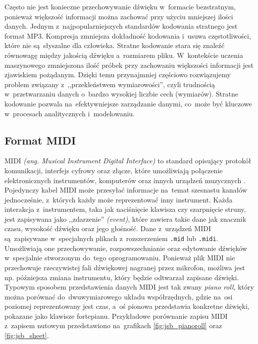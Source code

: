\documentclass[data-science]{agh-wi} %
\begin{document}
Często nie jest konieczne przechowywanie dźwięku w~formacie bezstratnym, ponieważ większość informacji można zachować przy użyciu mniejszej ilości danych. Jednym z~najpopularniejszych standardów kodowania stratnego jest format MP3. Kompresja zmniejsza dokładność kodowania i~usuwa częstotliwości, które nie są~słyszalne dla człowieka. Stratne kodowanie stara się znaleźć równowagę między jakością dźwięku a~rozmiarem pliku. W~kontekście uczenia maszynowego zmniejszona ilość próbek przy zachowaniu większości informacji jest zjawiskiem pożądanym. Dzięki temu przynajmniej częściowo rozwiązujemy problem związany z~,,przekleństwem wymiarowości'', czyli trudnością w~przetwarzaniu danych o~bardzo wysokiej liczbie cech (wymiarów). Stratne kodowanie pozwala na~efektywniejsze zarządzanie danymi, co~może być kluczowe w~procesach analitycznych i~modelowaniu.

\subsection{Format MIDI}
MIDI \textit{(ang. Musical Instrument Digital Interface)} to standard opisujący protokół komunikacji, interfejs cyfrowy oraz złącze, które umożliwiają połączenie elektronicznych instrumentów, komputerów oraz innych urządzeń muzycznych \cite{midi_specification}. Pojedynczy kabel MIDI może przesyłać informacje na~temat szesnastu kanałów jednocześnie, z~których każdy może reprezentować inny instrument. Każda interakcja z~instrumentem, taka jak naciśnięcie klawisza czy szarpnięcie struny, jest zapisywana jako ,,zdarzenie'' \textit{(event)}, które zawiera takie dane jak znacznik czasu, wysokość dźwięku oraz jego głośność. Dane z~urządzeń MIDI są~zapisywane w~specjalnych plikach z~rozszerzeniem \texttt{.mid} lub \texttt{.midi}. Umożliwiają one przechowywanie, rozpowszechnianie oraz edytowanie dźwięków w~specjalnie stworzonym do~tego oprogramowaniu. Ponieważ plik MIDI nie przechowuje rzeczywistej fali dźwiękowej nagranej przez mikrofon, możliwa jest np. późniejsza zmiana instrumentu, który będzie odtwarzał zapisane dźwięki. Typowym sposobem przedstawienia danych MIDI jest tak zwany \textit{piano roll}, który można porównać do~dwuwymiarowego układu współrzędnych, gdzie na~osi poziomej reprezentowany jest czas, a~oś pionowa przedstawia konkretne dźwięki, pokazane jako klawisze fortepianu. Przykładowe porównanie zapisu MIDI z~zapisem nutowym przedstawiono na~grafikach \ref*{fig:jsb_pianoroll} oraz \ref*{fig:jsb_sheet}.
\end{document}
